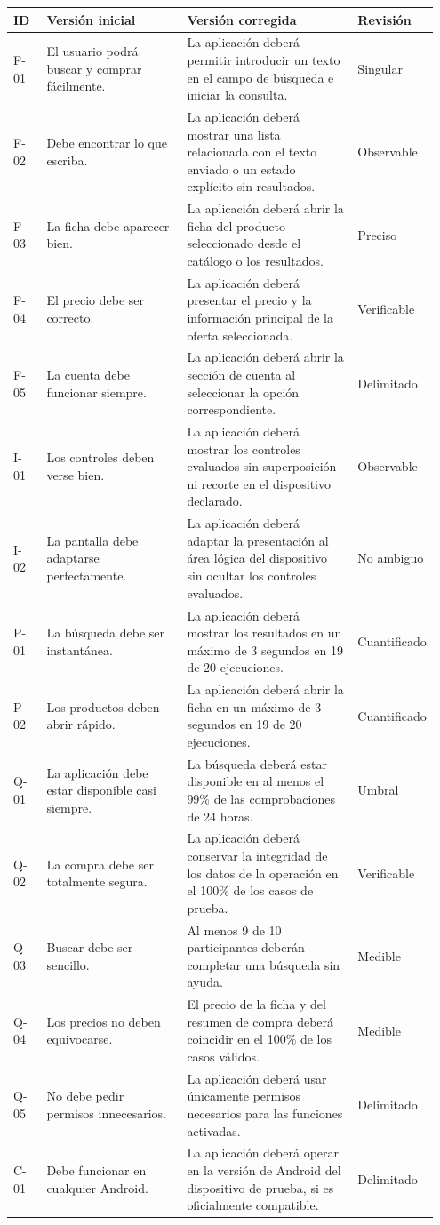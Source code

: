 \documentclass[10pt,a4paper]{article}
\begin{document}
	\small
	\begin{longtable}{p{0.08\linewidth}p{0.35\linewidth}p{0.43\linewidth}p{0.09\linewidth}}
		\toprule
		\textbf{ID} & \textbf{Versión inicial} & \textbf{Versión corregida} & \textbf{Revisión}\\
		\midrule
		\endhead
		F-01 & El usuario podrá buscar y comprar fácilmente. & La aplicación deberá permitir introducir un texto en el campo de búsqueda e iniciar la consulta. & Singular\\
		F-02 & Debe encontrar lo que escriba. & La aplicación deberá mostrar una lista relacionada con el texto enviado o un estado explícito sin resultados. & Observable\\
		F-03 & La ficha debe aparecer bien. & La aplicación deberá abrir la ficha del producto seleccionado desde el catálogo o los resultados. & Preciso\\
		F-04 & El precio debe ser correcto. & La aplicación deberá presentar el precio y la información principal de la oferta seleccionada. & Verificable\\
		F-05 & La cuenta debe funcionar siempre. & La aplicación deberá abrir la sección de cuenta al seleccionar la opción correspondiente. & Delimitado\\
		I-01 & Los controles deben verse bien. & La aplicación deberá mostrar los controles evaluados sin superposición ni recorte en el dispositivo declarado. & Observable\\
		I-02 & La pantalla debe adaptarse perfectamente. & La aplicación deberá adaptar la presentación al área lógica del dispositivo sin ocultar los controles evaluados. & No ambiguo\\
		P-01 & La búsqueda debe ser instantánea. & La aplicación deberá mostrar los resultados en un máximo de 3 segundos en 19 de 20 ejecuciones. & Cuantificado\\
		P-02 & Los productos deben abrir rápido. & La aplicación deberá abrir la ficha en un máximo de 3 segundos en 19 de 20 ejecuciones. & Cuantificado\\
		Q-01 & La aplicación debe estar disponible casi siempre. & La búsqueda deberá estar disponible en al menos el 99\% de las comprobaciones de 24 horas. & Umbral\\
		Q-02 & La compra debe ser totalmente segura. & La aplicación deberá conservar la integridad de los datos de la operación en el 100\% de los casos de prueba. & Verificable\\
		Q-03 & Buscar debe ser sencillo. & Al menos 9 de 10 participantes deberán completar una búsqueda sin ayuda. & Medible\\
		Q-04 & Los precios no deben equivocarse. & El precio de la ficha y del resumen de compra deberá coincidir en el 100\% de los casos válidos. & Medible\\
		Q-05 & No debe pedir permisos innecesarios. & La aplicación deberá usar únicamente permisos necesarios para las funciones activadas. & Delimitado\\
		C-01 & Debe funcionar en cualquier Android. & La aplicación deberá operar en la versión de Android del dispositivo de prueba, si es oficialmente compatible. & Delimitado\\
		\bottomrule
	\end{longtable}
\end{document}
